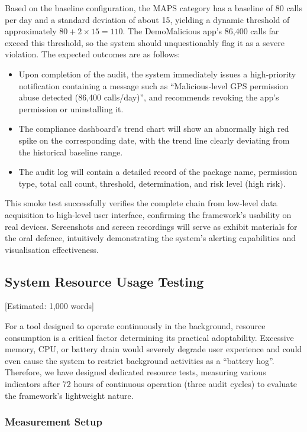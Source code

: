 Based on the baseline configuration, the MAPS category has a baseline of 80 calls per day and a standard deviation of about 15, yielding a dynamic threshold of approximately $80 + 2 \times 15 = 110$. The DemoMalicious app's 86,400 calls far exceed this threshold, so the system should unquestionably flag it as a severe violation. The expected outcomes are as follows:
\begin{itemize}
    \item Upon completion of the audit, the system immediately issues a high‑priority notification containing a message such as “Malicious‑level GPS permission abuse detected (86,400 calls/day)”, and recommends revoking the app's permission or uninstalling it.
    \item The compliance dashboard's trend chart will show an abnormally high red spike on the corresponding date, with the trend line clearly deviating from the historical baseline range.
    \item The audit log will contain a detailed record of the package name, permission type, total call count, threshold, determination, and risk level (high risk).
\end{itemize}
This smoke test successfully verifies the complete chain from low‑level data acquisition to high‑level user interface, confirming the framework's usability on real devices. Screenshots and screen recordings will serve as exhibit materials for the oral defence, intuitively demonstrating the system's alerting capabilities and visualisation effectiveness.

\subsection{System Resource Usage Testing} [Estimated: 1,000 words]

For a tool designed to operate continuously in the background, resource consumption is a critical factor determining its practical adoptability. Excessive memory, CPU, or battery drain would severely degrade user experience and could even cause the system to restrict background activities as a “battery hog”. Therefore, we have designed dedicated resource tests, measuring various indicators after 72 hours of continuous operation (three audit cycles) to evaluate the framework's lightweight nature.

\subsubsection{Measurement Setup}

